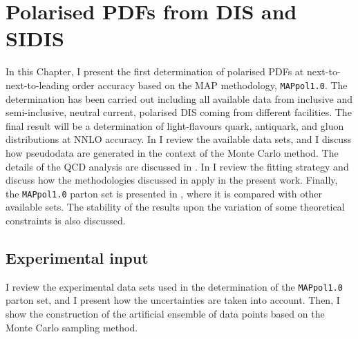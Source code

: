 \chapter{Polarised PDFs from DIS and SIDIS}
\label{ch:4}

In this Chapter, I present the first determination of polarised PDFs at next-to-next-to-leading order accuracy based on the MAP methodology, \texttt{MAPpol1.0}. The determination has been carried out including all available data from inclusive and semi-inclusive, neutral current, polarised DIS coming from different facilities. The final result will be a determination of light-flavours quark, antiquark, and gluon distributions at NNLO accuracy. In  I review the available data sets, and I discuss how pseudodata are generated in the context of the Monte Carlo method. The details of the QCD analysis are discussed in . In  I review the fitting strategy and discuss how the methodologies discussed in  apply in the present work. Finally, the \texttt{MAPpol1.0} parton set is presented in , where it is compared with other available sets. The stability of the results upon the variation of some theoretical constraints is also discussed.

\section{Experimental input}
\label{sec:4.1}

I review the experimental data sets used in the determination of the \texttt{MAPpol1.0} parton set, and I present how the uncertainties are taken into account. Then, I show the construction of the artificial ensemble of data points based on the Monte Carlo sampling method.

